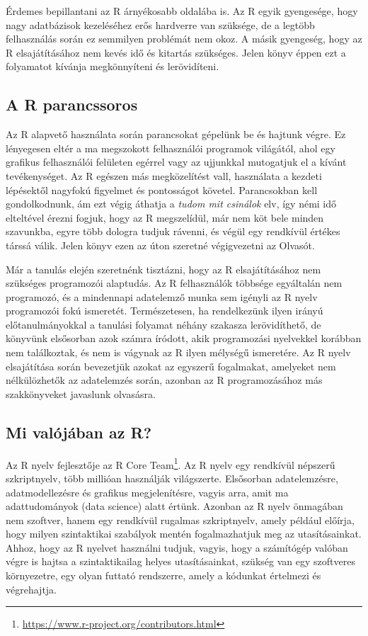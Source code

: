 \documentclass[
]{book}
\DeclareRobustCommand{\href}[2]{#2\footnote{\url{#1}}}
\renewcommand{\href}[2]{#2\footnote{\url{#1}}}
\begin{document}
Érdemes bepillantani az R árnyékosabb oldalába is. Az R egyik gyengesége, hogy nagy adatbázisok kezeléséhez erős hardverre van szüksége, de a legtöbb felhasználás során ez semmilyen problémát nem okoz. A másik gyengeség, hogy az R elsajátításához nem kevés idő és kitartás szükséges. Jelen könyv éppen ezt a folyamatot kívánja megkönnyíteni és lerövidíteni.

\hypertarget{a-r-parancssoros}{%
\subsection{A R parancssoros}\label{a-r-parancssoros}}

Az R alapvető használata során parancsokat gépelünk be és hajtunk végre. Ez lényegesen eltér a ma megszokott felhasználói programok világától, ahol egy grafikus felhasználói felületen egérrel vagy az ujjunkkal mutogatjuk el a kívánt tevékenységet. Az R egészen más megközelítést vall, használata a kezdeti lépésektől nagyfokú figyelmet és pontosságot követel. Parancsokban kell gondolkodnunk, ám ezt végig áthatja a \emph{tudom mit csinálok} elv, így némi idő elteltével érezni fogjuk, hogy az R megszelídül, már nem köt bele minden szavunkba, egyre több dologra tudjuk rávenni, és végül egy rendkívül értékes társsá válik. Jelen könyv ezen az úton szeretné végigvezetni az Olvasót.

Már a tanulás elején szeretnénk tisztázni, hogy az R elsajátításához nem szükséges programozói alaptudás. Az R felhasználók többsége egyáltalán nem programozó, és a mindennapi adatelemző munka sem igényli az R nyelv programozói fokú ismeretét. Természetesen, ha rendelkezünk ilyen irányú előtanulmányokkal a tanulási folyamat néhány szakasza lerövidíthető, de könyvünk elsősorban azok számra íródott, akik programozási nyelvekkel korábban nem találkoztak, és nem is vágynak az R ilyen mélységű ismeretére. Az R nyelv elsajátítása során bevezetjük azokat az egyszerű fogalmakat, amelyeket nem nélkülözhetők az adatelemzés során, azonban az R programozásához más szakkönyveket javaslunk olvasásra.

\hypertarget{mi-valuxf3juxe1ban-az-r}{%
\subsection{Mi valójában az R?}\label{mi-valuxf3juxe1ban-az-r}}

Az R nyelv fejlesztője az \href{https://www.r-project.org/contributors.html}{R Core Team}. Az R nyelv egy rendkívül népszerű szkriptnyelv, több millióan használják világszerte. Elsősorban adatelemzésre, adatmodellezésre és grafikus megjelenítésre, vagyis arra, amit ma adattudományok (data science) alatt értünk. Azonban az R nyelv önmagában nem szoftver, hanem egy rendkívül rugalmas szkriptnyelv, amely például előírja, hogy milyen szintaktikai szabályok mentén fogalmazhatjuk meg az utasításainkat. Ahhoz, hogy az R nyelvet használni tudjuk, vagyis, hogy a számítógép valóban végre is hajtsa a szintaktikailag helyes utasításainkat, szükség van egy szoftveres környezetre, egy olyan futtató rendszerre, amely a kódunkat értelmezi és végrehajtja.
\end{document}
